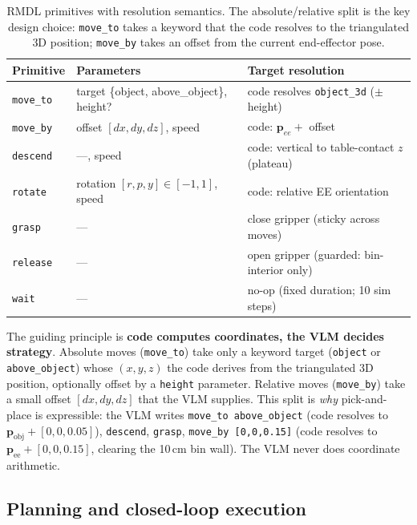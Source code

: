\documentclass[conference]{IEEEtran}
\begin{document}
\begin{table}[t]
\caption{RMDL primitives with resolution semantics. The absolute/relative split is the key design choice: \texttt{move\_to} takes a keyword that the code resolves to the triangulated 3D position; \texttt{move\_by} takes an offset from the current end-effector pose.}
\label{tab:dsl}
\centering\small
\begin{tabular}{@{}lll@{}}
\toprule
\textbf{Primitive} & \textbf{Parameters} & \textbf{Target resolution} \\
\midrule
\texttt{move\_to} & target \{object, above\_object\}, height? & code resolves \texttt{object\_3d} ($\pm$ height) \\
\texttt{move\_by} & offset $[dx,dy,dz]$, speed        & code: $\mathbf{p}_{ee}+$ offset \\
\texttt{descend}  & ---, speed                           & code: vertical to table-contact $z$ (plateau) \\
\texttt{rotate}   & rotation $[r,p,y]\!\in\![-1,1]$, speed & code: relative EE orientation \\
\texttt{grasp}    & ---                                  & close gripper (sticky across moves) \\
\texttt{release}  & ---                                  & open gripper (guarded: bin-interior only) \\
\texttt{wait}     & ---                                  & no-op (fixed duration; 10 sim steps) \\
\bottomrule
\end{tabular}
\end{table}

The guiding principle is \textbf{code computes coordinates, the VLM decides strategy}. Absolute moves (\texttt{move\_to}) take only a keyword target (\texttt{object} or \texttt{above\_object}) whose $(x,y,z)$ the code derives from the triangulated 3D position, optionally offset by a \texttt{height} parameter. Relative moves (\texttt{move\_by}) take a small offset $[dx,dy,dz]$ that the VLM supplies. This split is \emph{why} pick-and-place is expressible: the VLM writes \texttt{move\_to above\_object} (code resolves to $\mathbf{p}_\text{obj}+[0,0,0.05]$), \texttt{descend}, \texttt{grasp}, \texttt{move\_by [0,0,0.15]} (code resolves to $\mathbf{p}_\text{ee}+[0,0,0.15]$, clearing the 10\,cm bin wall). The VLM never does coordinate arithmetic.

\subsection{Planning and closed-loop execution}
\label{sec:closedloop}
\end{document}
